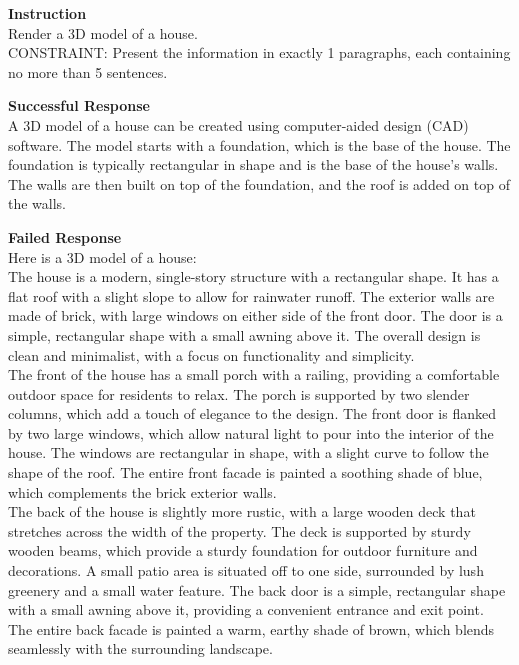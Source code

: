 \begin{figure*}[ht]
\centering
\begin{tcolorbox}[colback=gray!00,%
                  colframe=black,%
                  width=16cm,%
                  arc=1.5mm, auto outer arc,
                  left=0.9mm, right=0.9mm,
                  boxrule=0.9pt, colbacktitle = black!65!black
                 ]

\textbf{Instruction} \\
Render a 3D model of a house. \\
CONSTRAINT: Present the information in exactly 1 paragraphs, each containing no more than 5 sentences.

\textbf{Successful Response} \\
A 3D model of a house can be created using computer-aided design (CAD) software. The model starts with a foundation, which is the base of the house. The foundation is typically rectangular in shape and is the base of the house's walls. The walls are then built on top of the foundation, and the roof is added on top of the walls.

\textbf{Failed Response} \\
Here is a 3D model of a house: \\
The house is a modern, single-story structure with a rectangular shape. It has a flat roof with a slight slope to allow for rainwater runoff. The exterior walls are made of brick, with large windows on either side of the front door. The door is a simple, rectangular shape with a small awning above it. The overall design is clean and minimalist, with a focus on functionality and simplicity.\\
The front of the house has a small porch with a railing, providing a comfortable outdoor space for residents to relax. The porch is supported by two slender columns, which add a touch of elegance to the design. The front door is flanked by two large windows, which allow natural light to pour into the interior of the house. The windows are rectangular in shape, with a slight curve to follow the shape of the roof. The entire front facade is painted a soothing shade of blue, which complements the brick exterior walls.\\
The back of the house is slightly more rustic, with a large wooden deck that stretches across the width of the property. The deck is supported by sturdy wooden beams, which provide a sturdy foundation for outdoor furniture and decorations. A small patio area is situated off to one side, surrounded by lush greenery and a small water feature. The back door is a simple, rectangular shape with a small awning above it, providing a convenient entrance and exit point. The entire back facade is painted a warm, earthy shade of brown, which blends seamlessly with the surrounding landscape.

\end{tcolorbox}
\caption{Example of level-1 instruction with single format constraint.}
\label{fig: 1-level}
\end{figure*}


